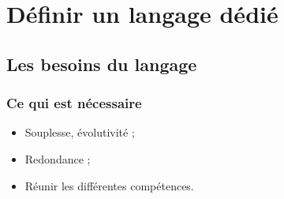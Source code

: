 \documentclass[]{beamer}
\begin{document}
\section{Définir un langage dédié}

\subsection{Les besoins du langage}
\begin{frame}
\frametitle{Ce qui est nécessaire}
\begin{itemize}[<+->]
    \item Souplesse, évolutivité ;
    \item Redondance ;
    \item Réunir les différentes compétences.
\end{itemize}
\end{frame}
\end{document}
